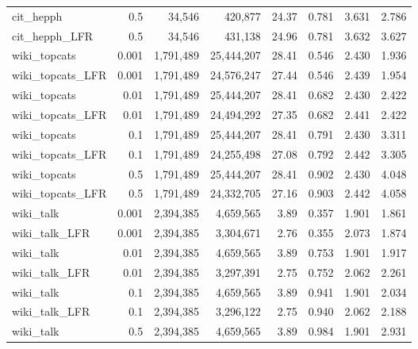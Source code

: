 \documentclass[a4paper]{article}   	%
\begin{document}
\begin{table}[h!]
\begin{tabular}{lrrrrrrr}
cit\_hepph      & 0.5   & 34,546 & 420,877 & 24.37    & 0.781 & 3.631 & 2.786 \\
cit\_hepph\_LFR & 0.5   & 34,546 & 431,138 & 24.96    & 0.781 & 3.632 & 3.627 \\ \hline \hline
wiki\_topcats      & 0.001 & 1,791,489 & 25,444,207 & 28.41    & 0.546 & 2.430 & 1.936 \\
wiki\_topcats\_LFR & 0.001 & 1,791,489 & 24,576,247 & 27.44    & 0.546 & 2.439 & 1.954 \\ \hline
wiki\_topcats      & 0.01  & 1,791,489 & 25,444,207 & 28.41    & 0.682 & 2.430 & 2.422 \\
wiki\_topcats\_LFR & 0.01  & 1,791,489 & 24,494,292 & 27.35    & 0.682 & 2.441 & 2.422 \\ \hline
wiki\_topcats      & 0.1   & 1,791,489 & 25,444,207 & 28.41    & 0.791 & 2.430 & 3.311 \\
wiki\_topcats\_LFR & 0.1   & 1,791,489 & 24,255,498 & 27.08    & 0.792 & 2.442 & 3.305 \\ \hline
wiki\_topcats      & 0.5   & 1,791,489 & 25,444,207 & 28.41    & 0.902 & 2.430 & 4.048 \\
wiki\_topcats\_LFR & 0.5   & 1,791,489 & 24,332,705 & 27.16    & 0.903 & 2.442 & 4.058 \\ \hline \hline
wiki\_talk      & 0.001 & 2,394,385 & 4,659,565 & 3.89     & 0.357 & 1.901 & 1.861 \\
wiki\_talk\_LFR & 0.001 & 2,394,385 & 3,304,671 & 2.76     & 0.355 & 2.073 & 1.874 \\ \hline
wiki\_talk      & 0.01  & 2,394,385 & 4,659,565 & 3.89     & 0.753 & 1.901 & 1.917 \\
wiki\_talk\_LFR & 0.01  & 2,394,385 & 3,297,391 & 2.75     & 0.752 & 2.062 & 2.261 \\ \hline
wiki\_talk      & 0.1   & 2,394,385 & 4,659,565 & 3.89     & 0.941 & 1.901 & 2.034 \\
wiki\_talk\_LFR & 0.1   & 2,394,385 & 3,296,122 & 2.75     & 0.940 & 2.062 & 2.188 \\ \hline
wiki\_talk      & 0.5   & 2,394,385 & 4,659,565 & 3.89     & 0.984 & 1.901 & 2.931 \\ \hline
\end{tabular}
\label{table:all-params}
\end{table}

 \clearpage
\end{document}
